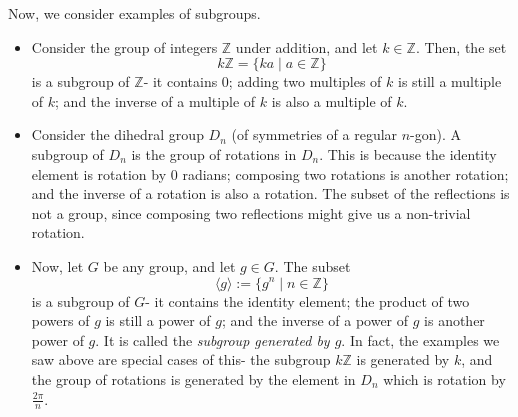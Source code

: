 \documentclass[a4paper, openany]{memoir}
\theoremstyle{definition}
\theoremstyle{plain}
\begin{document}
Now, we consider examples of subgroups.
\begin{itemize}
    \item Consider the group of integers $\mathbb{Z}$ under addition, and let $k \in \mathbb{Z}$. Then, the set
    \[k \mathbb{Z} = \{ka \mid a \in \mathbb{Z}\}\]
    is a subgroup of $\mathbb{Z}$- it contains 0; adding two multiples of $k$ is still a multiple of $k$; and the inverse of a multiple of $k$ is also a multiple of $k$.
    \item Consider the dihedral group $D_n$ (of symmetries of a regular $n$-gon). A subgroup of $D_n$ is the group of rotations in $D_n$. This is because the identity element is rotation by $0$ radians; composing two rotations is another rotation; and the inverse of a rotation is also a rotation. The subset of the reflections is not a group, since composing two reflections might give us a non-trivial rotation.
    \item Now, let $G$ be any group, and let $g \in G$. The subset
    \[\langle g \rangle := \{g^n \mid n \in \mathbb{Z}\}\]
    is a subgroup of $G$- it contains the identity element; the product of two powers of $g$ is still a power of $g$; and the inverse of a power of $g$ is another power of $g$. It is called the \emph{subgroup generated by $g$}. In fact, the examples we saw above are special cases of this- the subgroup $k \mathbb{Z}$ is generated by $k$, and the group of rotations is generated by the element in $D_n$ which is rotation by $\frac{2\pi}{n}$.
\end{itemize}
\end{document}

